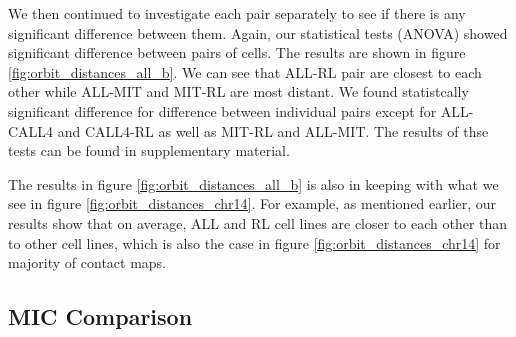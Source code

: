 \documentclass[a4,center,fleqn]{NAR}
\begin{document}
We then continued to investigate each pair separately to
see if there is any significant difference between them.
Again, our statistical tests (ANOVA) showed significant difference
between pairs of cells.
The results are shown in figure \ref{fig:orbit_distances_all_b}.
We can see that ALL-RL pair are closest to each other while
ALL-MIT and MIT-RL are most distant. We found statistcally
significant difference for difference between individual
pairs except for ALL-CALL4 and CALL4-RL as well as
MIT-RL and ALL-MIT. The results of thse tests 
can be found in supplementary material.

The results in figure \ref{fig:orbit_distances_all_b} is also
in keeping with what we see in figure \ref{fig:orbit_distances_chr14}. For example, as mentioned earlier, our results show that
on average, ALL
and RL cell lines are closer to each other than to other
cell lines, which is also the case in figure
\ref{fig:orbit_distances_chr14} for majority of contact maps.

\subsection{MIC Comparison}
\end{document}
